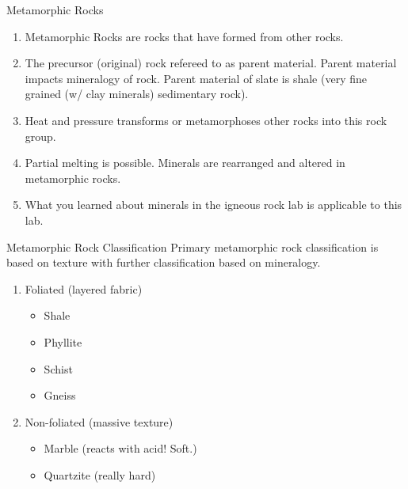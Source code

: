 \documentclass[ignorenonframetext,slidestop]{beamer}
\begin{document}
\begin{frame}{Metamorphic Rocks}
  \begin{enumerate}
  \item Metamorphic Rocks are rocks that have formed from other rocks.
  \item The precursor (original) rock refereed to as parent material. Parent material impacts mineralogy of rock. Parent material of slate is shale (very fine grained (w/ clay minerals) sedimentary rock).
  \item Heat and pressure transforms or metamorphoses other rocks into this rock group. 
  \item Partial melting is possible. Minerals are rearranged and altered in metamorphic rocks.
  \item What you learned about minerals in the igneous rock lab is applicable to this lab.
  \end{enumerate}
\end{frame}

\begin{frame}{Metamorphic Rock Classification}
  Primary metamorphic rock classification is based on texture with further classification based on mineralogy.
  \begin{enumerate}
  \item Foliated (layered fabric)
    \begin{itemize}
    \item Shale
    \item Phyllite
    \item Schist
    \item Gneiss
    \end{itemize}
  \item Non-foliated (massive texture)
    \begin{itemize}
    \item Marble (reacts with acid! Soft.)
    \item Quartzite (really hard)
    \end{itemize}
  \end{enumerate}
\end{frame}
\end{document}
